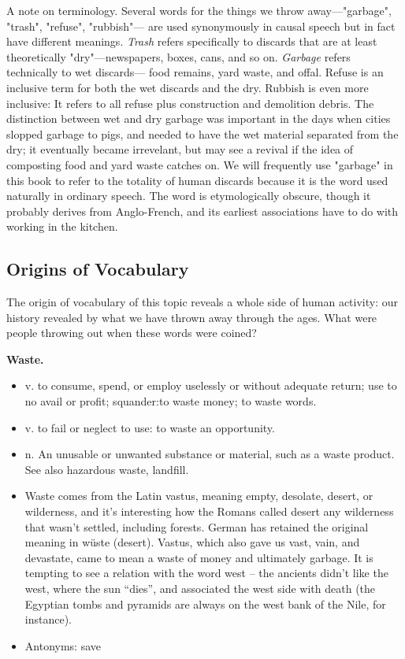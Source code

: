 A note on terminology. Several words for the things we throw away---"garbage", "trash", "refuse", "rubbish"--- are used synonymously in causal speech but in fact have different meanings. \textit{Trash} refers specifically to discards that are at least theoretically "dry"---newspapers, boxes, cans, and so on. \textit{Garbage} refers technically to wet discards--- food remains, yard waste, and offal. Refuse is an inclusive term for both the wet discards and the dry. Rubbish is even more inclusive: It refers to all refuse plus construction and demolition debris. The distinction between wet and dry garbage was important in the days when cities slopped garbage to pigs, and needed to have the wet material separated from the dry; it eventually became irrevelant, but may see a revival if the idea of composting food and yard waste catches on. We will frequently use "garbage" in this book to refer to the totality of human discards because it is the word used naturally in ordinary speech. The word is etymologically obscure, though it probably derives from Anglo-French, and its earliest associations have to do with working in the kitchen.

\subsection{Origins of Vocabulary}
The origin of vocabulary of this topic reveals a whole side of human activity: our history revealed by what we have thrown away through the ages. What were people throwing out when these words were coined? 

\textbf{Waste.}
\begin{itemize}
\item v. to consume, spend, or employ uselessly or without adequate return; use to no avail or profit; squander:to waste money; to waste words.
\item v. to fail or neglect to use: to waste an opportunity.
\item n. An unusable or unwanted substance or material, such as a waste product. See also hazardous waste, landfill. 
\item Waste comes from the Latin vastus, meaning empty, desolate, desert, or wilderness, and it’s interesting how the Romans called desert any wilderness that wasn’t settled, including forests.  German has retained the original meaning in wüste (desert). Vastus, which also gave us vast, vain, and devastate, came to mean a waste of money and ultimately garbage.  It is tempting to see a relation with the word west – the ancients didn’t like the west, where the sun “dies”, and associated the west side with death (the Egyptian tombs and pyramids are always on the west bank of the Nile, for instance)\cite{paul2013garbage}.
\item Antonyms: save
\end{itemize}

